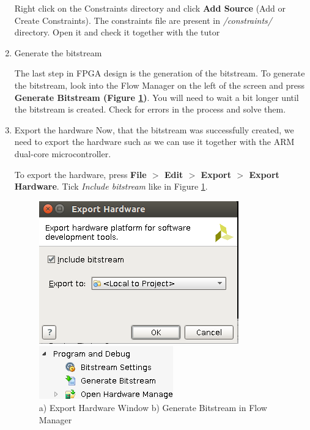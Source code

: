 \documentclass{article}
\begin{document}
\begin{enumerate}
Right click on the Constraints directory and click \textbf{Add Source} (Add or Create Constraints). The constraints file are present in \textit{/constraints/} directory.
Open it and check it together with the tutor


\item Generate the bitstream 

The last step in FPGA design is the generation of the bitstream.
To generate the bitstream, look into the Flow Manager on the left of the screen and press \textbf{Generate Bitstream (Figure \ref{fig:export_hardware_generate_bitstream})}. You will need to wait a bit longer until the bitstream is created. Check for errors in the process and solve them. 

\item Export the hardware
Now, that the bitstream was successfully created, we need to export the hardware such as we can use it together with the ARM dual-core microcontroller. 

To export the hardware, press \textbf{File $>$ Edit $>$ Export $>$ Export Hardware}. Tick \textit{Include bitstream} like in Figure \ref{fig:export_hardware_generate_bitstream}.


 \begin{figure}[h!]
\centering
\begin{minipage}{.425\textwidth}
  \centering
  \includegraphics[width=0.8\linewidth]{img/export_hardware.png}
\end{minipage}%
\begin{minipage}{.425\textwidth}
  \centering
  \includegraphics[width=0.8\linewidth]{img/generate_bitstream.png}
\end{minipage}
\caption{a) Export Hardware Window b) Generate Bitstream in Flow Manager}
\label{fig:export_hardware_generate_bitstream}
\end{figure}

\end{enumerate}
\end{document}
